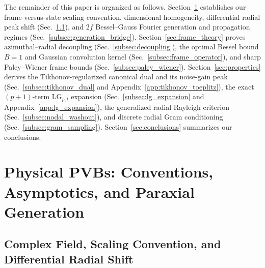 \documentclass[aps,pra,onecolumn,notitlepage,11pt,tightenlines,nofootinbib,floatfix,longbibliography]{revtex4-2}
\theoremstyle{remark}
\begin{document}
The remainder of this paper is organized as follows. Section~\ref{sec:pvb_formation} establishes our frame-versus-state scaling convention, dimensional homogeneity, differential radial peak shift (Sec.~\ref{subsec:pvb_def}), and $2f$ Bessel--Gauss Fourier generation and propagation regimes (Sec.~\ref{subsec:generation_bridge}). Section~\ref{sec:frame_theory} proves azimuthal--radial decoupling (Sec.~\ref{subsec:decoupling}), the optimal Bessel bound $B = 1$ and Gaussian convolution kernel (Sec.~\ref{subsec:frame_operator}), and sharp Paley--Wiener frame bounds (Sec.~\ref{subsec:paley_wiener}). Section~\ref{sec:properties} derives the Tikhonov-regularized canonical dual and its noise-gain peak (Sec.~\ref{subsec:tikhonov_dual} and Appendix~\ref{app:tikhonov_toeplitz}), the exact $(p+1)$-term $\mathrm{LG}_{p,l}$ expansion (Sec.~\ref{subsec:lg_expansion} and Appendix~\ref{app:lg_expansion}), the generalized radial Rayleigh criterion (Sec.~\ref{subsec:nodal_washout}), and discrete radial Gram conditioning (Sec.~\ref{subsec:gram_sampling}). Section~\ref{sec:conclusions} summarizes our conclusions.

\section{Physical PVBs: Conventions, Asymptotics, and Paraxial Generation}
\label{sec:pvb_formation}

\subsection{Complex Field, Scaling Convention, and Differential Radial Shift}
\label{subsec:pvb_def}
\end{document}
